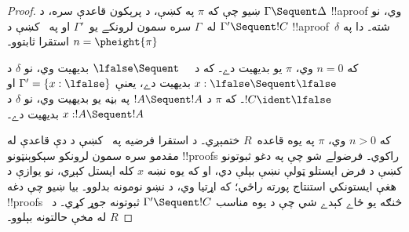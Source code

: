 \documentclass[../../../include/open-logic-section]{subfiles}
\begin{document}
\begin{proof}
  ښيو چې که $\pi$ په  کښې، د پرېکون قاعدې سره، د
  $\Gamma \Sequent \Delta$ !!a{proof} وي، نو له~$\Gamma$ سره
  سمون لرونکے يو~$\Gamma'$ او په~ کښې د
  $\Gamma' \Sequent !C$ !!a{proof}~$\delta$ شته۔ دا په
  $n = \pheight{\pi}$ استقرا ثابتوو۔

  که $n = 0$ وي، $\pi$ يو بديهيت دے۔ که د
  $\lfalse \Sequent \quad$ بديهيت وي، نو $\delta$ د
  $x:\lfalse \Sequent \lfalse$ بديهيت دے، يعنې
  $\Gamma' = \{x:\lfalse\}$ او $!C \ident \lfalse$۔ که $\pi$
  د $!A \Sequent !A$ په بڼه يو بديهيت وي، نو $\delta$ د
  $x: !A \Sequent !A$ بديهيت دے۔

  که $n>0$ وي، $\pi$ په يوه قاعده~$R$ ختمېږي۔ د استقرا
  فرضيه په~ کښې د دې قاعدې له مقدمو سره سمون لرونکو
  سېکوېنټونو !!{proof}s راکوي۔ فرضولے شو چې په دغو ثبوتونو کښې
  د فرض ايستلو ټولې نښې بېلې دي، او که يوه نښه $x$ کله ايستل
  کېږي، نو يوازې د هغې ايستونکي استنتاج پورته راځي؛ که اړتيا
  وي، د نښو نومونه بدلوو۔ بيا ښيو چې دغه !!{proof}s څنګه يو
  ځاے کېدے شي چې د يوه مناسب $\Gamma' \Sequent !C$ ثبوتونه
  جوړ کړي۔ د~$R$ له مخې حالتونه بېلوو۔


\end{proof}
\end{document}
